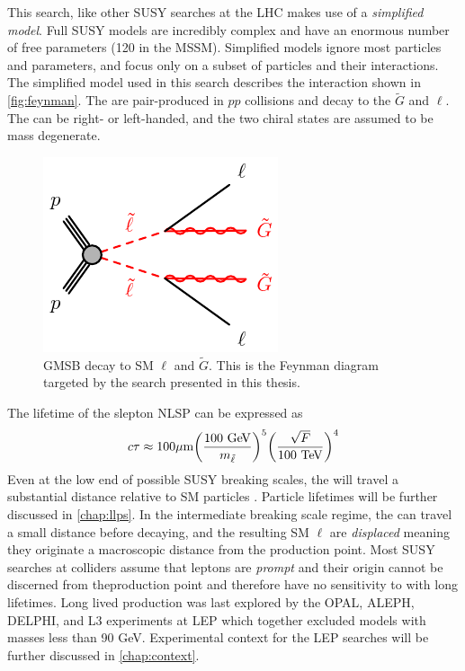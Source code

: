 This search, like other \ac{SUSY} searches at the \ac{LHC} makes use of a \emph{simplified model}.
Full \ac{SUSY} models are incredibly complex and have an enormous number of free parameters (120 in the \ac{MSSM}). Simplified models ignore most particles and parameters, and focus only on a subset of particles and their interactions. The simplified model used in this search describes the interaction shown in \autoref{fig:feynman}. The \slep are pair-produced in $pp$ collisions and decay to the $\tilde{G}$ and $\ell$. The \slep can be right- or left-handed, and the two chiral states are assumed to be mass degenerate.

\begin{figure}[!h]
\centering
\includegraphics[width=.4\textwidth]{figures/theory/slsl-llGG-GMSB.pdf}
\caption{\ac{GMSB} \slep decay to \ac{SM} $\ell$ and $\tilde{G}$. This is the Feynman diagram targeted by the search presented in this thesis.}
\label{fig:feynman}
\end{figure}


The lifetime of the slepton \ac{NLSP} can be expressed as
\begin{equation}
   c \tau \approx 100 \um \bigg(\frac{100 \GeV}{m_{\slep}}\bigg)^5\bigg(\frac{\sqrt{F}}{100 \TeV}\bigg)^4
\label{eq:lt}
\end{equation}
Even at the low end of possible \ac{SUSY} breaking scales, the \slep will travel a substantial distance relative to \ac{SM} particles \cite{jesseshelton}. Particle lifetimes will be further discussed in \autoref{chap:llps}. In the intermediate breaking scale regime, the \slep can travel a small distance before decaying, and the resulting \ac{SM} $\ell$ are \emph{displaced} meaning they originate a macroscopic distance from the \slep production point. Most \ac{SUSY} searches at colliders assume that leptons are \emph{prompt} and their origin cannot be discerned from the\slep production point and therefore have no sensitivity to \slep with long lifetimes. Long lived \slep production was last explored by the OPAL, ALEPH, DELPHI, and L3 experiments at \ac{LEP} which together excluded models with \slep masses less than 90 GeV. Experimental context for the LEP searches will be further discussed in \autoref{chap:context}.


